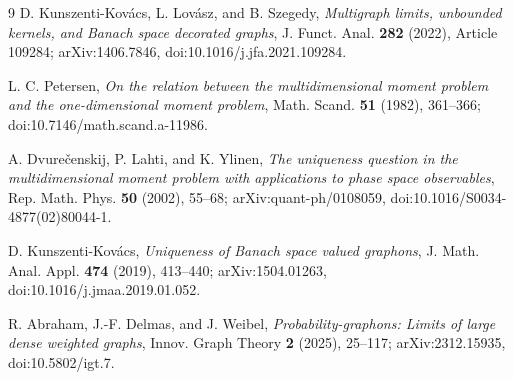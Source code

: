 \documentclass[11pt]{article}
\theoremstyle{remark}
\begin{document}
\begin{thebibliography}{9}
D. Kunszenti-Kov\'acs, L. Lov\'asz, and B. Szegedy,
\emph{Multigraph limits, unbounded kernels, and Banach space decorated
graphs}, J. Funct. Anal. \textbf{282} (2022), Article 109284;
arXiv:1406.7846, doi:10.1016/j.jfa.2021.109284.

L. C. Petersen,
\emph{On the relation between the multidimensional moment problem and the
one-dimensional moment problem}, Math. Scand. \textbf{51} (1982), 361--366;
doi:10.7146/math.scand.a-11986.

A. Dvure\v{c}enskij, P. Lahti, and K. Ylinen,
\emph{The uniqueness question in the multidimensional moment problem with
applications to phase space observables}, Rep. Math. Phys. \textbf{50}
(2002), 55--68; arXiv:quant-ph/0108059,
doi:10.1016/S0034-4877(02)80044-1.

D. Kunszenti-Kov\'acs,
\emph{Uniqueness of Banach space valued graphons}, J. Math. Anal. Appl.
\textbf{474} (2019), 413--440; arXiv:1504.01263,
doi:10.1016/j.jmaa.2019.01.052.

R. Abraham, J.-F. Delmas, and J. Weibel,
\emph{Probability-graphons: Limits of large dense weighted graphs},
Innov. Graph Theory \textbf{2} (2025), 25--117; arXiv:2312.15935,
doi:10.5802/igt.7.
\end{thebibliography}
\end{document}
